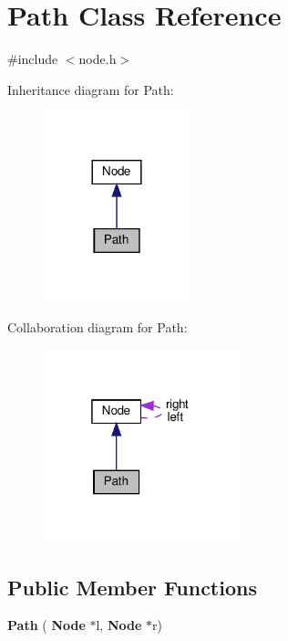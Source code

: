 \section{Path Class Reference}
\label{class_path}


{\ttfamily \#include $<$node.\+h$>$}



Inheritance diagram for Path\+:
\nopagebreak
\begin{figure}[H]
\begin{center}
\leavevmode
\includegraphics[width=120pt]{class_path__inherit__graph}
\end{center}
\end{figure}


Collaboration diagram for Path\+:
\nopagebreak
\begin{figure}[H]
\begin{center}
\leavevmode
\includegraphics[width=160pt]{class_path__coll__graph}
\end{center}
\end{figure}
\subsection*{Public Member Functions}
\begin{DoxyCompactItemize}
\item 
\textbf{ Path} (\textbf{ Node} $\ast$l, \textbf{ Node} $\ast$r)
\end{DoxyCompactItemize}
